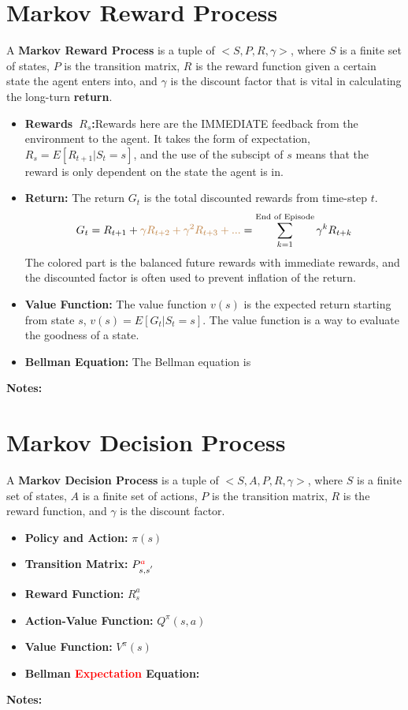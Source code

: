 \documentclass{article}
\begin{document}
\section{Markov Reward Process}
A \textbf{Markov Reward Process} is a tuple of $<S, P, R, \gamma>$, where $S$ is a finite set of states, $P$ is the transition matrix, $R$ is the reward function given
a certain state the agent enters into, and $\gamma$ is the discount factor that is vital in calculating the long-turn \textbf{return}.
\begin{itemize}
    \item \textbf{Rewards~$R_s$:}Rewards here are the IMMEDIATE feedback from the environment to the agent. It takes the form of expectation, $R_s = E[R_{t+1}|S_t = s]$, and
    the use of the subscipt of $s$ means that the reward is only dependent on the state the agent is in.
    \item \textbf{Return:} The return $G_t$ is the total discounted rewards from time-step $t$. 
    $$G_t = R_{t+1} + \textcolor{brown}{\gamma R_{t+2} + \gamma^2 R_{t+3} + ... } = \sum_{k=1}^{\text{End of Episode}} \gamma^k R_{t+k}$$
    The colored part is the balanced future rewards with immediate rewards, and the discounted factor is often used to prevent inflation of the return.
    \item \textbf{Value Function:} The value function $v(s)$ is the expected return starting from state $s$, $v(s) = E[G_t|S_t = s]$. The value function is a way to evaluate
    the goodness of a state.
    \item \textbf{Bellman Equation:} The Bellman equation is
\end{itemize}
\vspace{2em}
\textbf{Notes:}
\section{Markov Decision Process}
A \textbf{Markov Decision Process} is a tuple of $<S, A, P, R, \gamma>$, where $S$ is a finite set of states, $A$ is a finite set of actions, $P$ is the transition matrix,
$R$ is the reward function, and $\gamma$ is the discount factor.
\begin{itemize}
    \item \textbf{Policy and Action:} $\pi(s)$
    \item \textbf{Transition Matrix:} $P^{\textcolor{red}{a}}_{s,s^{'}}$
    \item \textbf{Reward Function:} $R^a_s$
    \item \textbf{Action-Value Function:}  $Q^\pi(s,a)$
    \item \textbf{Value Function:} $V^\pi(s)$
    \item \textbf{Bellman \textcolor{red}{Expectation} Equation:}
\end{itemize}
\vspace{2em} 
\textbf{Notes:}
\end{document}
